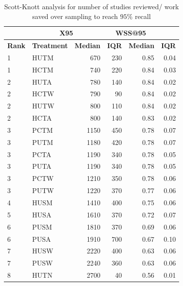 \documentclass{svjour3}
\theoremstyle{break}
\begin{document}
\begin{table}
\caption{Scott-Knott analysis for number of studies reviewed/ work saved over sampling to reach $95\%$ recall}
\label{tab: scottknott}


\begin{center}
\parbox{.49\linewidth}{
\centering
{\scriptsize \begin{tabular}{l@{~~~}l@{~~~}r@{~~~}r@{~~~}r@{~~~}r}
\arrayrulecolor{lightgray}
\multicolumn{2}{l}{\textbf{Wahono}}  & \multicolumn{2}{c}{\textbf{X95}} & \multicolumn{2}{c}{\textbf{WSS@95}}\\\hline
\textbf{Rank} & \textbf{Treatment} & \textbf{Median} & \textbf{IQR} & \textbf{Median} & \textbf{IQR} \\\hline
\rowcolor{green!40}
  1 &         HUTM &    670  &  230 & 0.85 & 0.04 \\
  1 &         HCTM &    740  &  220 & 0.84 & 0.03 \\
\hline  2 &         HUTA &    780  &  140 & 0.84 & 0.02 \\
  2 &         HCTW &    790  &  90 & 0.84 & 0.02 \\
  2 &         HUTW &    800  &  110 & 0.84 & 0.02 \\
  2 &         HCTA &    800  &  140 & 0.83 & 0.02 \\
\hline  3 &         PCTM &    1150  &  450 & 0.78 & 0.07  \\
  3 &         PUTM &    1180  &  420 & 0.78 & 0.07 \\
  3 &         PCTA &    1190  &  340 & 0.78 & 0.05 \\
  3 &         PUTA &    1190  &  340 & 0.78 & 0.05 \\
\rowcolor{red!30}
  3 &         PCTW &    1210  &  350 &  0.78 & 0.06 \\
  3 &         PUTW &    1220  &  370 &  0.77 & 0.06 \\
\hline  4 &         HUSM &    1410  &  400 & 0.75 & 0.06 \\
\hline  5 &         HUSA &    1610  &  370 & 0.72 & 0.07 \\
\hline  6 &         PUSM &    1810  &  370 & 0.69 & 0.06 \\
\rowcolor{red!30}
  6 &         PUSA &    1910  &  700 & 0.67 & 0.10 \\
\hline  7 &         HUSW &    2220  &  400 & 0.63 & 0.06 \\
  7 &         PUSW &    2240  &  360 & 0.63 & 0.06 \\
\hline  8 &         HUTN &    2700  &  40 & 0.56 & 0.01 \\

\end{tabular}}}
\end{center}
\end{table}
\end{document}
